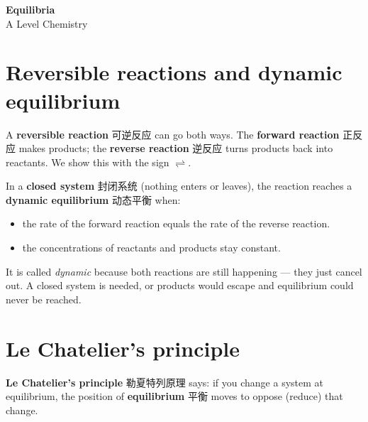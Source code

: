 \documentclass[11pt]{article}
\begin{document}
\begin{center}
  {\LARGE\bfseries Equilibria}\\[0.35em]
  {\large A Level Chemistry}
\end{center}
\vspace{0.6em}

\section*{Reversible reactions and dynamic equilibrium}

A \textbf{reversible reaction} 可逆反应 can go both ways. The \textbf{forward reaction} 正反应 makes products; the \textbf{reverse reaction} 逆反应 turns products back into reactants. We show this with the sign $\rightleftharpoons$.

In a \textbf{closed system} 封闭系统 (nothing enters or leaves), the reaction reaches a \textbf{dynamic equilibrium} 动态平衡 when:

\begin{itemize}
\item the rate of the forward reaction equals the rate of the reverse reaction.

\item the concentrations of reactants and products stay constant.

\end{itemize}

It is called \emph{dynamic} because both reactions are still happening — they just cancel out. A closed system is needed, or products would escape and equilibrium could never be reached.

\section*{Le Chatelier's principle}

\textbf{Le Chatelier's principle} 勒夏特列原理 says: if you change a system at equilibrium, the position of \textbf{equilibrium} 平衡 moves to oppose (reduce) that change.

\begin{center}
\end{center}
\end{document}
